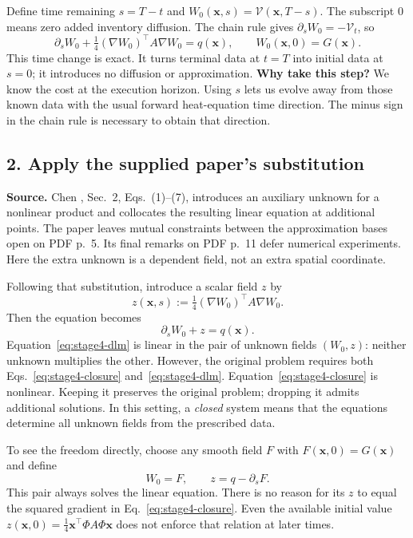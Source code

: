 Define time remaining $s=T-t$ and
$W_0(\mathbf x,s)=\mathcal V(\mathbf x,T-s)$. The subscript $0$ means
zero added inventory diffusion. The chain rule gives
$\partial_sW_0=-\mathcal V_t$, so
\begin{equation}
 \boxed{\partial_sW_0+
 \tfrac14(\nabla W_0)^\top A\nabla W_0=q(\mathbf x),
 \qquad W_0(\mathbf x,0)=G(\mathbf x).}
 \label{eq:stage4-inviscid}
\end{equation}
This time change is exact. It turns terminal data at $t=T$ into initial
data at $s=0$; it introduces no diffusion or approximation.
\textbf{Why take this step?} We know the cost at the execution horizon.
Using $s$ lets us evolve away from those known data with the usual
forward heat-equation time direction. The minus sign in the chain rule
is necessary to obtain that direction.

\subsection*{2. Apply the supplied paper's substitution}

\textbf{Source.} Chen \cite{chen2001}, Sec.~2, Eqs.~(1)--(7),
introduces an auxiliary unknown for a nonlinear product and collocates the
resulting linear equation at additional points. The paper leaves mutual
constraints between the approximation bases open on PDF p.~5. Its final
remarks on PDF p.~11 defer numerical experiments. Here the extra unknown
is a dependent field, not an extra spatial coordinate.

Following that substitution, introduce a scalar field $z$ by
\begin{equation}
 z(\mathbf x,s):=\tfrac14(\nabla W_0)^\top A\nabla W_0.
 \label{eq:stage4-closure}
\end{equation}
Then the equation becomes
\begin{equation}
 \boxed{\partial_sW_0+z=q(\mathbf x).}
 \label{eq:stage4-dlm}
\end{equation}
Equation~\eqref{eq:stage4-dlm} is linear in the pair of unknown fields
$(W_0,z)$: neither unknown multiplies the other. However, the original
problem requires both Eqs.~\eqref{eq:stage4-closure}
and~\eqref{eq:stage4-dlm}. Equation~\eqref{eq:stage4-closure} is nonlinear.
Keeping it preserves the original problem; dropping it admits additional
solutions. In this setting, a \emph{closed} system means that the equations
determine all unknown fields from the prescribed data.

To see the freedom directly, choose any smooth field $F$ with
$F(\mathbf x,0)=G(\mathbf x)$ and define
\[
 W_0=F,\qquad z=q-\partial_sF.
\]
This pair always solves the linear equation. There is no reason for its
$z$ to equal the squared gradient in Eq.~\eqref{eq:stage4-closure}.
Even the available initial value
$z(\mathbf x,0)=\tfrac14\mathbf x^\top\Phi A\Phi\mathbf x$
does not enforce that relation at later times.

